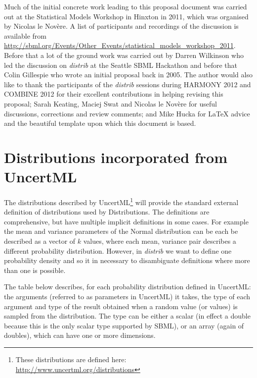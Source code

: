 \documentclass[draftspec]{sbmlpkgspec}
\newcommand{\distribshort}{\emph{distrib}\xspace}
\newcommand{\distrib}{Distributions\xspace}
\newcommand{\uncertml}{UncertML\xspace}
\begin{document}
Much of the initial concrete work leading to this proposal document
was carried out at the Statistical Models Workshop in Hinxton in 2011,
which was organised by Nicolas le Nov\`{e}re. A list of participants
and recordings of the discussion is available from
\url{http://sbml.org/Events/Other_Events/statistical_models_workshop_2011}.
Before that a lot of the ground work was carried out by Darren
Wilkinson who led the discussion on \distribshort at the Seattle SBML
Hackathon and before that Colin Gillespie who wrote an initial
proposal back in 2005. The author would also like to thank the
participants of the \distribshort sessions during HARMONY 2012 and
COMBINE 2012 for their excellent contributions in helping revising
this proposal; Sarah Keating, Maciej Swat and Nicolas le Nov\`{e}re
for useful discussions, corrections and review comments; and Mike
Hucka for \LaTeX{} advice and the beautiful template upon which this
document is based.

\appendix
\section{Distributions incorporated from \uncertml}
\label{sec:uncertmlusage}

The distributions described by \uncertml \footnote{These
  distributions are defined here:
  \url{http://www.uncertml.org/distributions}} will provide the
standard external definition of distributions used by \distrib. The
definitions are comprehensive, but have multiple implicit definitions
in some cases. For example the mean and variance parameters of the
Normal distribution can be each be described as a vector of $k$
values, where each mean, variance pair describes a different
probability distribution. However, in \distribshort we want to define
one probability density and so it in necessary to disambiguate
definitions where more than one is possible.

The table below describes, for each probability distribution defined in
\uncertml: the arguments (referred to as parameters in \uncertml) it
takes, the type of each argument and type of the result obtained when
a random value (or values) is sampled from the distribution. The type
can be either a scalar (in effect a double because this is the only
scalar type supported by SBML), or an array (again of doubles), which
can have one or more dimensions.
\end{document}
